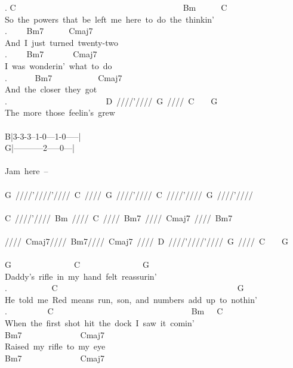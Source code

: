 {. C\ \ \ \ \ \ \ \ \ \ \ \ \ \ \ \ \ \ \ \ \ \ \ \ \ \ \ \ \ \ \ \ \ \ \ \ \ \ \ \ Bm\ \ \ \ \ \ C\\
So\ the\ powers\ that\ be\ left\ me\ here\ to\ do\ the\ thinkin'\\
. \ \ \ \ Bm7\ \ \ \ \ \ Cmaj7\\
And\ I\ just\ turned\ twenty-two\\
. \ \ \ \ Bm7\ \ \ \ \ \ \ Cmaj7\\
I\ was\ wonderin'\ what\ to\ do\\
. \ \ \ \ \ \ Bm7\ \ \ \ \ \ \ \ \ \ \ Cmaj7\\
And\ the\ closer\ they\ got\\
. \ \ \ \ \ \ \ \ \ \ \ \ \ \ \ \ \ \ \ \ \ \ \ D\ ////'////\ G\ ////\ C\ \ \ \ G\\
The\ more\ those\ feelin's\ grew\\
\\
B|3-3-3--1-0---1-0-----|\\
G|-----------2-----0---|\\
\\
Jam\ here\ --\\
\\
G\ ////'////'////\ C\ ////\ G\ ////'////\ C\ ////'////\ G\ ////'////\\
\\
C\ ////'////\ Bm\ ////\ C\ ////\ Bm7\ ////\ Cmaj7\ ////\ Bm7\\
\\
////\ Cmaj7////\ Bm7////\ Cmaj7\ ////\ D\ ////'////'////\ G\ ////\ C\ \ \ \ G\\
\\
G\ \ \ \ \ \ \ \ \ \ \ \ \ \ \ C\ \ \ \ \ \ \ \ \ \ \ \ \ \ \ G\\
Daddy's\ rifle\ in\ my\ hand\ felt\ reassurin'\\
. \ \ \ \ \ \ \ \ \ \ C\ \ \ \ \ \ \ \ \ \ \ \ \ \ \ \ \ \ \ \ \ \ \ \ \ \ \ \ \ \ \ \ \ \ \ \ \ \ \ \ \ \ \ G\\
He\ told\ me\ \;Red\ means\ run,\ son,\ and\ numbers\ add\ up\ to\ nothin'\;\\
. \ \ \ \ \ \ \ \ \ C\ \ \ \ \ \ \ \ \ \ \ \ \ \ \ \ \ \ \ \ \ \ \ \ \ \ \ \ \ \ \ \ \ Bm\ \ \ C\\
When\ the\ first\ shot\ hit\ the\ dock\ I\ saw\ it\ comin'\\
Bm7\ \ \ \ \ \ \ \ \ \ \ \ \ \ Cmaj7\\
Raised\ my\ rifle\ to\ my\ eye\\
Bm7\ \ \ \ \ \ \ \ \ \ \ \ \ \ Cmaj7\\
}
